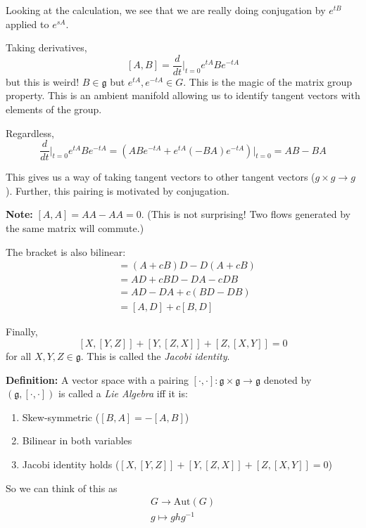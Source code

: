 \documentclass[12pt]{article}
\begin{document}
    Looking at the calculation, we see that we are really doing conjugation by $e^{tB}$ applied to $e^{sA}$. 

    Taking derivatives, 
    \[[A, B] = \frac{d}{dt}\bigg\vert_{t=0} e^{tA} Be^{-tA}\] 
    but this is weird! $B \in \mathfrak{g}$ but $e^{tA}, e^{-tA} \in G$. This is the magic of the matrix group property. This is an ambient manifold allowing us to identify tangent vectors with elements of the group. 

    Regardless, 
    \[\frac{d}{dt}\bigg\vert_{t=0} e^{tA} Be^{-tA} = (ABe^{-tA} + e^{tA}(-BA)e^{-tA})\bigg\vert_{t=0} = AB - BA\]
    
    This gives us a way of taking tangent vectors to other tangent vectors ($g \times g \to g$). Further, this pairing is motivated by conjugation.

    \textbf{Note:} $[A, A] = AA - AA = 0$. (This is not surprising! Two flows generated by the same matrix will commute.)

    The bracket is also bilinear: 
    \begin{align*}
        [A + cB, D] &= (A + cB)D - D(A + cB)\\ 
        &= AD + cBD - DA - cDB\\ 
        & = AD - DA + c(BD - DB)\\ 
        &= [A, D] + c[B, D]
    \end{align*}

    Finally, 
    \[[X, [Y, Z]] + [Y, [Z, X]] + [Z, [X, Y]] =0\]
    for all $X, Y, Z \in \mathfrak{g}$. This is called the \emph{Jacobi identity}. 

    \textbf{Definition:} A vector space with a pairing $[\cdot, \cdot]:\mathfrak{g}\times\mathfrak{g}\to \mathfrak{g}$ denoted by $(\mathfrak{g}, [\cdot, \cdot])$ is called a \emph{Lie Algebra} iff it is:
    \begin{enumerate}
        \item Skew-symmetric ($[B, A] = -[A, B]$)
        \item Bilinear in both variables 
        \item Jacobi identity holds ($[X, [Y, Z]] + [Y, [Z, X]] + [Z, [X, Y]] = 0$)
    \end{enumerate}

    So we can think of this as 
    \[\begin{array}{c}
        G \to \text{Aut}(G)\\ 
        g \mapsto ghg^{-1}
    \end{array}\]
\end{document}
